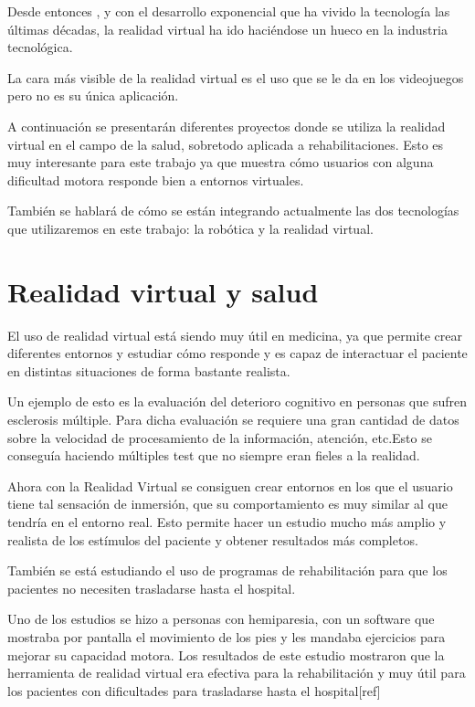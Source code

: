 \documentclass[twoside, 12pt]{epstfg}
\begin{document}
Desde entonces , y con el desarrollo exponencial que ha vivido la tecnología las últimas décadas, la realidad virtual ha ido haciéndose un hueco en la industria tecnológica.

La cara más visible de la realidad virtual es el uso que se le da en los videojuegos pero no es su única aplicación.

A continuación se presentarán diferentes proyectos donde se utiliza la realidad virtual en el campo de la salud, sobretodo aplicada a rehabilitaciones. Esto es muy interesante para este trabajo ya que muestra cómo usuarios con alguna dificultad motora responde bien a entornos virtuales.

También se hablará de cómo se están integrando actualmente  las dos tecnologías que utilizaremos en este trabajo: la robótica y la realidad virtual.


\section{Realidad virtual y salud}
\label{sec:VR y salud}

El uso de realidad virtual está siendo muy útil en medicina, ya que permite crear diferentes entornos y estudiar cómo responde y  es capaz de interactuar el paciente en distintas situaciones de forma bastante realista.

Un ejemplo de esto es la evaluación del deterioro cognitivo en personas que sufren esclerosis múltiple. Para dicha evaluación se requiere una gran cantidad de datos sobre la velocidad de procesamiento de la información, atención, etc.Esto se conseguía haciendo múltiples test que no siempre eran fieles a la realidad.

Ahora con la Realidad Virtual se consiguen crear entornos en los que el usuario tiene tal sensación de inmersión, que su comportamiento es muy similar al que tendría en el entorno real. Esto permite hacer un estudio mucho más amplio y realista de los estímulos del paciente y obtener resultados más completos.\cite{LamargueHamel201594}


También se está estudiando el uso de programas de rehabilitación para que los pacientes no necesiten trasladarse hasta el hospital.

Uno de los estudios se hizo a personas con hemiparesia, con un software que mostraba por pantalla el movimiento de los pies y les mandaba ejercicios para mejorar su capacidad motora. Los resultados de este estudio mostraron que la herramienta de realidad virtual era efectiva para la rehabilitación y muy útil para los pacientes con dificultades para trasladarse hasta el hospital[ref]
\end{document}
